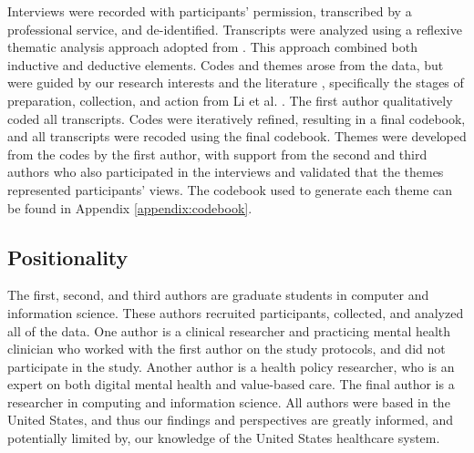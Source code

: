 Interviews were recorded with participants' permission, transcribed by a professional service, and de-identified.
Transcripts were analyzed using a reflexive thematic analysis approach adopted from \cite{braun_using_2006}.
This approach combined both inductive and deductive elements.
Codes and themes arose from the data, but were guided by our research interests and the literature \cite{braun_one_2021}, specifically the stages of preparation, collection, and action from Li et al. \cite{li_stage-based_2010}.
The first author qualitatively coded all transcripts.
Codes were iteratively refined, resulting in a final codebook, and all transcripts were recoded using the final codebook.
Themes were developed from the codes by the first author, with support from the second and third authors who also participated in the interviews and validated that the themes represented participants' views.
The codebook used to generate each theme can be found in Appendix \ref{appendix:codebook}.

\subsection{Positionality}
\label{sec:methods:positionality}

The first, second, and third authors are graduate students in computer and information science. 
These authors recruited participants, collected, and analyzed all of the data. 
One author is a clinical researcher and practicing mental health clinician who worked with the first author on the study protocols, and did not participate in the study. 
Another author is a health policy researcher, who is an expert on both digital mental health and value-based care.
The final author is a researcher in computing and information science. 
All authors were based in the United States, and thus our findings and perspectives are greatly informed, and potentially limited by, our knowledge of the United States healthcare system.